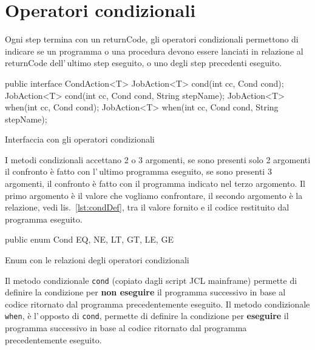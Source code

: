 \section{Operatori condizionali} \label{sec:opCond}
Ogni step termina con un returnCode, gli operatori condizionali permettono
di indicare se un programma o una procedura devono essere lanciati in relazione
al returnCode dell'\,ultimo step eseguito, o uno degli step precedenti eseguito.

\begin{elisting}[!htb]
\begin{javacode}
public interface CondAction<T> {
    JobAction<T> cond(int cc, Cond cond);
    JobAction<T> cond(int cc, Cond cond, String stepName);
    JobAction<T> when(int cc, Cond cond);
    JobAction<T> when(int cc, Cond cond, String stepName);
}
\end{javacode}
\caption{Interfaccia con gli operatori condizionali}
\label{lst:condActionDef}
\end{elisting}

I metodi condizionali accettano 2 o 3 argomenti, se sono presenti solo 2
argomenti il confronto è fatto con l'\,ultimo programma eseguito, se sono
presenti 3 argomenti, il confronto è fatto con il programma indicato nel terzo
argomento.
Il primo argomento è il valore che vogliamo confrontare,
il secondo argomento è la relazione, vedi lis.~\ref{lst:condDef}, tra il valore
fornito e il codice restituito dal programma eseguito.

\begin{elisting}[!htb]
\begin{javacode}
public enum Cond {
    EQ, NE, LT, GT, LE, GE
}
\end{javacode}
\caption{Enum con le relazioni degli operatori condizionali}
\label{lst:condDef}
\end{elisting}

Il metodo condizionale \texttt{cond} (copiato dagli script JCL mainframe)
permette di definire la condizione per \textbf{non eseguire} il programma
successivo in base al codice ritornato dal programma precedentemente eseguito.
Il metodo condizionale \texttt{when}, è l'\,opposto di \texttt{cond}, permette
di definire la condizione per \textbf{eseguire} il programma successivo in base
al codice ritornato dal programma precedentemente eseguito.


